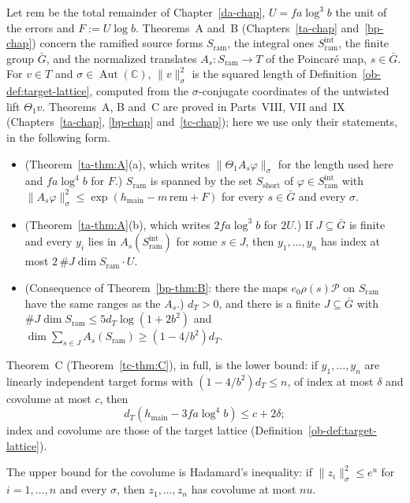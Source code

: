 \documentclass[reqno]{amsart}
\newcounter{chap}
\theoremstyle{definition}
\theoremstyle{plain}
\newcommand{\C}{{\mathbb{C}}}
\newcommand{\main}{h_{\mathrm{main}}}
\newcommand{\rem}{\mathrm{rem}}
\begin{document}
Let \(\rem\) be the total remainder of Chapter~\ref{da-chap}, \(U = fa\log^3 b\) the unit of the errors and \(F := U\log b\).  Theorems~A and~B (Chapters~\ref{ta-chap} and~\ref{bp-chap}) concern the ramified source forms \(S_{\mathrm{ram}}\), the integral ones \(S_{\mathrm{ram}}^{\mathrm{int}}\), the finite group \(\bar G\), and the normalized translates \(A_s \colon S_{\mathrm{ram}} \to T\) of the Poincar\'e map, \(s \in \bar G\).  For \(v \in T\) and \(\sigma \in \operatorname{Aut}(\C)\), \(\lVert v \rVert_\sigma^2\) is the squared length of Definition~\ref{ob-def:target-lattice}, computed from the \(\sigma\)-conjugate coordinates of the untwisted lift \(\Theta_1 v\).  Theorems~A, B and~C are proved in Parts~VIII, VII and~IX (Chapters~\ref{ta-chap}, \ref{bp-chap} and~\ref{tc-chap}); here we use only their statements, in the following form.
\begin{itemize}
\item[(A1)] (Theorem~\ref{ta-thm:A}(a), which writes \(\lVert \Theta_1 A_s\varphi \rVert_\sigma\) for the length used here and \(fa\log^4 b\) for \(F\).)  \(S_{\mathrm{ram}}\) is spanned by the set \(S_{\mathrm{short}}\) of \(\varphi \in S_{\mathrm{ram}}^{\mathrm{int}}\) with \(\lVert A_s\varphi \rVert_\sigma^2 \le \exp(\main - m\,\rem + F)\) for every \(s \in \bar G\) and every \(\sigma\).
\item[(A2)] (Theorem~\ref{ta-thm:A}(b), which writes \(2fa\log^3 b\) for \(2U\).)  If \(J \subseteq \bar G\) is finite and every \(y_i\) lies in \(A_s(S_{\mathrm{ram}}^{\mathrm{int}})\) for some \(s \in J\), then \(y_1, \dots, y_n\) has index at most \(2\,\# J \dim S_{\mathrm{ram}} \cdot U\).
\item[(B)] (Consequence of Theorem~\ref{bp-thm:B}: there the maps \(e_0\rho(s)\mathcal{P}\) on \(S_{\mathrm{ram}}\) have the same ranges as the \(A_s\).)  \(d_T > 0\), and there is a finite \(J \subseteq \bar G\) with \(\# J \dim S_{\mathrm{ram}} \le 5d_T\log(1 + 2b^2)\) and \(\dim \sum_{s \in J} A_s(S_{\mathrm{ram}}) \ge (1 - 4/b^2)d_T\).
\end{itemize}
Theorem~C (Theorem~\ref{tc-thm:C}), in full, is the lower bound: if \(y_1, \dots, y_n\) are linearly independent target forms with \((1 - 4/b^2)d_T \le n\), of index at most \(\delta\) and covolume at most \(c\), then
\[
  d_T(\main - 3fa\log^4 b) \le c + 2\delta ;
\]
index and covolume are those of the target lattice (Definition~\ref{ob-def:target-lattice}).

The upper bound for the covolume is Hadamard's inequality: if \(\lVert z_i \rVert_\sigma^2 \le e^u\) for \(i = 1, \dots, n\) and every \(\sigma\), then \(z_1, \dots, z_n\) has covolume at most \(nu\).
\end{document}
